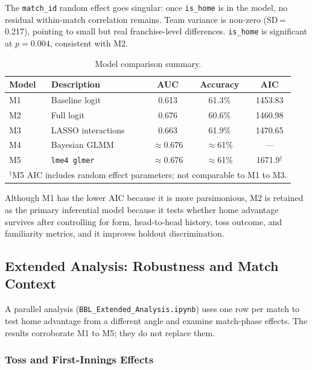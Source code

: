 \documentclass[12pt,a4paper]{article}
\begin{document}
The \texttt{match\_id} random effect goes singular: once \texttt{is\_home} is in the model,
no residual within-match correlation remains. Team variance is non-zero (SD\,=\,0.217),
pointing to small but real franchise-level differences. \texttt{is\_home} is significant at
$p = 0.004$, consistent with M2.

\begin{table}[H]
\centering
\caption{Model comparison summary.}
\label{tab:comparison}
\begin{tabular}{llccc}
\toprule
\textbf{Model} & \textbf{Description} & \textbf{AUC} & \textbf{Accuracy} & \textbf{AIC} \\
\midrule
M1 & Baseline logit         & 0.613 & 61.3\% & 1453.83 \\
M2 & Full logit             & 0.676 & 60.6\% & 1460.98 \\
M3 & LASSO interactions     & 0.663 & 61.9\% & 1470.65 \\
M4 & Bayesian GLMM          & $\approx$0.676 & $\approx$61\% & --- \\
M5 & \texttt{lme4 glmer}    & $\approx$0.676 & $\approx$61\% & 1671.9$^\dagger$ \\
\bottomrule
\multicolumn{5}{l}{\small $^\dagger$M5 AIC includes random effect parameters; not comparable to M1 to M3.}
\end{tabular}
\end{table}

Although M1 has the lower AIC because it is more parsimonious, M2 is retained as the
primary inferential model because it tests whether home advantage survives after controlling
for form, head-to-head history, toss outcome, and familiarity metrics, and it improves
holdout discrimination.

\subsection{Extended Analysis: Robustness and Match Context}
\label{sec:extended}

A parallel analysis (\texttt{BBL\_Extended\_Analysis.ipynb}) uses one row per match to test
home advantage from a different angle and examine match-phase effects. The results
corroborate M1 to M5; they do not replace them.

\subsubsection{Toss and First-Innings Effects}
\end{document}
